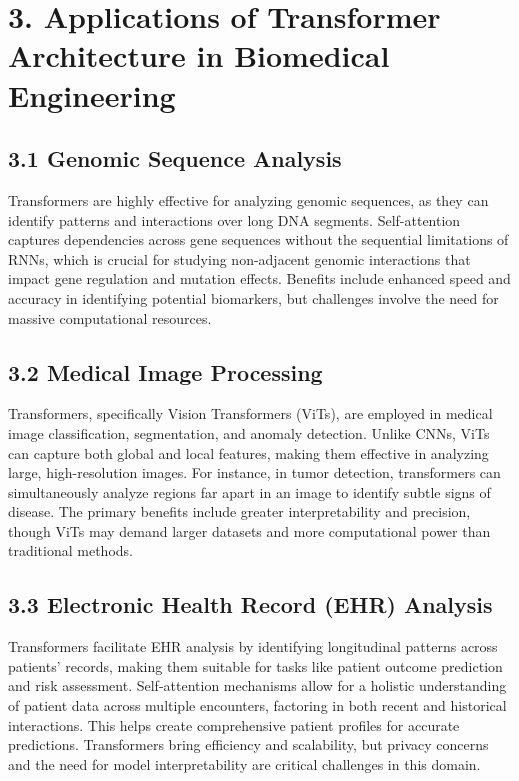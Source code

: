 \documentclass[12pt]{article}
\begin{document}
\section*{3. Applications of Transformer Architecture in Biomedical Engineering}

\subsection*{3.1 Genomic Sequence Analysis}
Transformers are highly effective for analyzing genomic sequences, as they can identify patterns and interactions over long DNA segments. Self-attention captures dependencies across gene sequences without the sequential limitations of RNNs, which is crucial for studying non-adjacent genomic interactions that impact gene regulation and mutation effects. Benefits include enhanced speed and accuracy in identifying potential biomarkers, but challenges involve the need for massive computational resources.

\subsection*{3.2 Medical Image Processing}
Transformers, specifically Vision Transformers (ViTs), are employed in medical image classification, segmentation, and anomaly detection. Unlike CNNs, ViTs can capture both global and local features, making them effective in analyzing large, high-resolution images. For instance, in tumor detection, transformers can simultaneously analyze regions far apart in an image to identify subtle signs of disease. The primary benefits include greater interpretability and precision, though ViTs may demand larger datasets and more computational power than traditional methods.

\subsection*{3.3 Electronic Health Record (EHR) Analysis}
Transformers facilitate EHR analysis by identifying longitudinal patterns across patients' records, making them suitable for tasks like patient outcome prediction and risk assessment. Self-attention mechanisms allow for a holistic understanding of patient data across multiple encounters, factoring in both recent and historical interactions. This helps create comprehensive patient profiles for accurate predictions. Transformers bring efficiency and scalability, but privacy concerns and the need for model interpretability are critical challenges in this domain.
\end{document}
